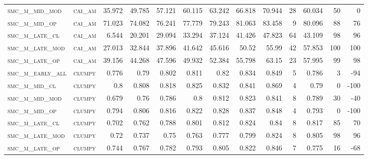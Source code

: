 \begin{landscape}
\begin{center}
\begin{footnotesize}
\begin{longtable}{llrrrrrrrr|rrr}
\textsc{smc\_m\_mid\_mod  } & \textsc{cai\_am   }   & 35.972   & 49.785   & 57.121   & 60.115   & 63.242   & 66.818   & 70.944   & 28     & 60.034        & 50            & 0               \\
\textsc{smc\_m\_mid\_op   } & \textsc{cai\_am   }   & 71.023   & 74.082   & 76.241   & 77.779   & 79.243   & 81.063   & 83.458   & 9      & 80.096        & 88            & 76              \\
\textsc{smc\_m\_late\_cl  } & \textsc{cai\_am   }   & 6.544    & 20.201   & 29.094   & 33.294   & 37.124   & 41.426   & 47.823   & 64     & 43.109        & 98            & 96              \\
\textsc{smc\_m\_late\_mod } & \textsc{cai\_am   }   & 27.013   & 32.844   & 37.896   & 41.642   & 45.616   & 50.52    & 55.99    & 42     & 57.853        & 100           & 100             \\
\textsc{smc\_m\_late\_op  } & \textsc{cai\_am   }   & 39.156   & 44.268   & 47.596   & 49.932   & 52.384   & 55.798   & 63.15    & 23     & 57.995        & 99            & 98              \\
\textsc{smc\_m\_early\_all} & \textsc{clumpy    }   & 0.776    & 0.79     & 0.802    & 0.811    & 0.82     & 0.834    & 0.849    & 5      & 0.786         & 3             & -94             \\
\textsc{smc\_m\_mid\_cl   } & \textsc{clumpy    }   & 0.8      & 0.808    & 0.818    & 0.825    & 0.832    & 0.841    & 0.869    & 4      & 0.79          & 0             & -100            \\
\textsc{smc\_m\_mid\_mod  } & \textsc{clumpy    }   & 0.679    & 0.76     & 0.786    & 0.8      & 0.812    & 0.823    & 0.841    & 8      & 0.789         & 30            & -40             \\
\textsc{smc\_m\_mid\_op   } & \textsc{clumpy    }   & 0.794    & 0.806    & 0.816    & 0.822    & 0.828    & 0.837    & 0.848    & 4      & 0.793         & 0             & -100            \\
\textsc{smc\_m\_late\_cl  } & \textsc{clumpy    }   & 0.702    & 0.762    & 0.788    & 0.801    & 0.812    & 0.824    & 0.84     & 8      & 0.817         & 85            & 70              \\
\textsc{smc\_m\_late\_mod } & \textsc{clumpy    }   & 0.72     & 0.737    & 0.75     & 0.763    & 0.777    & 0.799    & 0.824    & 8      & 0.805         & 98            & 96              \\
\textsc{smc\_m\_late\_op  } & \textsc{clumpy    }   & 0.744    & 0.767    & 0.782    & 0.793    & 0.805    & 0.822    & 0.846    & 7      & 0.775         & 16            & -68             \\

\end{longtable}
\end{footnotesize}
\end{center}
\end{landscape}
